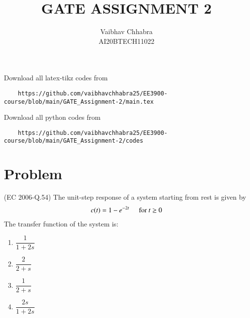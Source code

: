 \documentclass[journal,12pt,twocolumn]{IEEEtran}
\begin{document}
     \def\topbox#1{\raisebox{-\baselineskip}[0in][0in]{#1}}
     \def\midbox#1{\raisebox{-0.5\baselineskip}[0in][0in]{#1}}
\vspace{3cm}
\title{GATE ASSIGNMENT 2}
\author{Vaibhav Chhabra\\ AI20BTECH11022}
\maketitle
\newpage
\bigskip
\renewcommand{\thefigure}{\theenumi}
\renewcommand{\thetable}{\theenumi}
Download all latex-tikz codes from 
%
\begin{lstlisting}
    https://github.com/vaibhavchhabra25/EE3900-course/blob/main/GATE_Assignment-2/main.tex
\end{lstlisting}
%
Download all python codes from
\begin{lstlisting}
    https://github.com/vaibhavchhabra25/EE3900-course/blob/main/GATE_Assignment-2/codes
\end{lstlisting}

\section{Problem}
(EC 2006-Q.54) The unit-step response of a system starting from rest is given by
\begin{align}
    c(t)=1-e^{-2t} \hspace{0.5cm} \text{for} \  t\geq0 
\end{align}
The transfer function of the system is:
\begin{enumerate}
    \item $\dfrac{1}{1+2s}$ \vspace{0.2cm}
    \item $\dfrac{2}{2+s}$ \vspace{0.2cm}
    \item $\dfrac{1}{2+s}$ \vspace{0.2cm}
    \item $\dfrac{2s}{1+2s}$
\end{enumerate}
\end{document}
